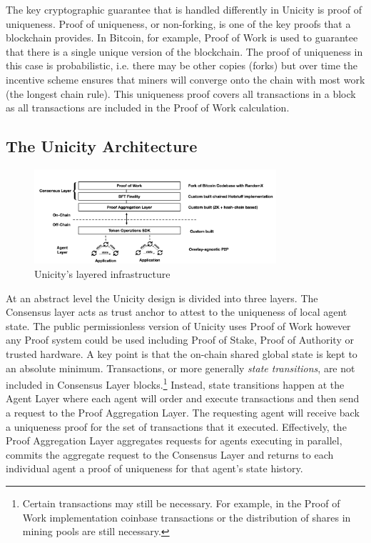 \documentclass{article}
\begin{document}
The key cryptographic guarantee that is handled differently in Unicity is proof of uniqueness. Proof of uniqueness, or non-forking, is one of the key proofs that a blockchain provides. In Bitcoin, for example, Proof of Work is used to guarantee that there is a single unique version of the blockchain. The proof of uniqueness in this case is probabilistic, i.e. there may be other copies (forks) but over time the incentive scheme ensures that miners will converge onto the chain with most work (the longest chain rule). This uniqueness proof covers all transactions in a block as all transactions are included in the Proof of Work calculation.

\subsection{The Unicity Architecture}

\begin{figure}[htbp]
    \centering
    \includegraphics[width=0.8\textwidth]{FullStack.png}
    \caption{Unicity's layered infrastructure}
    \label{fig:layers}
\end{figure}

At an abstract level the Unicity design is divided into three layers. The Consensus layer acts as trust anchor to attest to the uniqueness of local agent state. The public permissionless version of Unicity uses Proof of Work however any Proof system could be used including Proof of Stake, Proof of Authority or trusted hardware. A key point is that the on-chain shared global state is kept to an absolute minimum. Transactions, or more generally \textit{state transitions}, are not included in Consensus Layer blocks.\footnote{Certain transactions may still be necessary. For example, in the Proof of Work implementation coinbase transactions or the distribution of shares in mining pools are still necessary.}
Instead, state transitions happen at the Agent Layer where each agent will order and execute transactions and then send a request to the Proof Aggregation Layer. The requesting agent will receive back a uniqueness proof for the set of transactions that it executed. Effectively, the Proof Aggregation Layer aggregates requests for agents executing in parallel,  commits the aggregate request to the Consensus Layer and returns to each individual agent a proof of uniqueness for that agent's state history.
\end{document}
